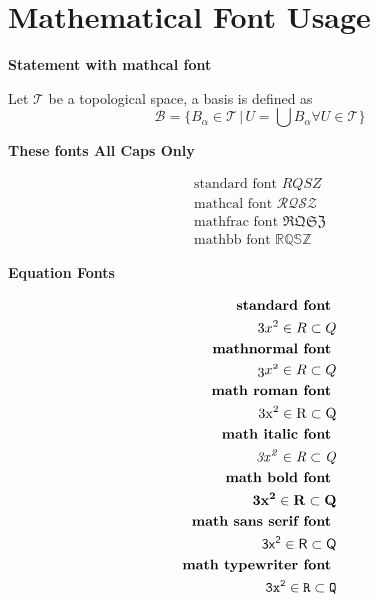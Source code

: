 \documentclass{article}
\begin{document}
\section*{Mathematical Font Usage}
\vspace{.50in}

\textbf{Statement with mathcal font}
\medskip

Let \( \mathcal{T} \) be a topological space, a basis is defined as
 \[
\mathcal{B} = \{B_{\alpha} \in \mathcal{T}\, |\,  U = \bigcup B_{\alpha} \forall U \in \mathcal{T} \}
 \]

\vspace{1cm}

\textbf{These fonts All Caps Only} 

\begin{align*}
\text{standard font } RQSZ \\
\text{mathcal font } \mathcal{RQSZ} \\
\text{mathfrac font } \mathfrak{RQSZ} \\
\text{mathbb font } \mathbb{RQSZ}
\end{align*}

\textbf{Equation Fonts}

\begin{align*}
\textbf{standard font } \\
3x^2 \in R \subset Q \\
\textbf{mathnormal font } \\
\mathnormal{3x^2 \in R \subset Q} \\
\textbf{math roman font } \\
\mathrm{3x^2 \in R \subset Q} \\
\textbf{math italic font } \\
\mathit{3x^2 \in R \subset Q} \\
\textbf{math bold font } \\
\mathbf{3x^2 \in R \subset Q} \\
\textbf{math sans serif font } \\
\mathsf{3x^2 \in R \subset Q} \\
\textbf{math typewriter font } \\
\mathtt{3x^2 \in R \subset Q} 
\end{align*}
\end{document}
